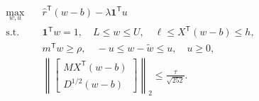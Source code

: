 \documentclass[12pt,a4paper]{article}
\begin{document}
\begin{problem}
\[
\begin{aligned}
\max_{w,u}\quad&
\widehat r^{\mathsf T}(w-b)-\lambda\mathbf1^{\mathsf T}u\\
\text{s.t.}\quad&
\mathbf1^{\mathsf T}w=1,\quad L\leq w\leq U,\quad
\ell\leq X^{\mathsf T}(w-b)\leq h,\\
&m^{\mathsf T}w\geq\rho,\quad
-u\leq w-\widetilde w\leq u,\quad u\geq0,\\
&\left\|
\begin{bmatrix}
MX^{\mathsf T}(w-b)\\ D^{1/2}(w-b)
\end{bmatrix}
\right\|_2\leq\frac{\tau}{\sqrt{252}}.
\end{aligned}
\]
\end{problem}

\newpage
\end{document}
